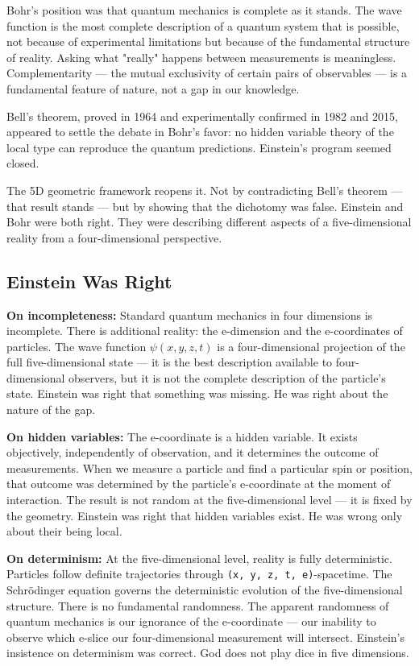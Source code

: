 \documentclass[aps,prd,preprint,superscriptaddress,longbibliography,floatfix]{revtex4-2}
\theoremstyle{remark}
\begin{document}
Bohr's position was that quantum mechanics is complete as it stands. The wave function is the most complete description of a quantum system that is possible, not because of experimental limitations but because of the fundamental structure of reality. Asking what "really" happens between measurements is meaningless. Complementarity --- the mutual exclusivity of certain pairs of observables --- is a fundamental feature of nature, not a gap in our knowledge.

Bell's theorem, proved in 1964 and experimentally confirmed in 1982 and 2015, appeared to settle the debate in Bohr's favor: no hidden variable theory of the local type can reproduce the quantum predictions. Einstein's program seemed closed.

The 5D geometric framework reopens it. Not by contradicting Bell's theorem --- that result stands --- but by showing that the dichotomy was false. Einstein and Bohr were both right. They were describing different aspects of a five-dimensional reality from a four-dimensional perspective.



\subsection{Einstein Was Right}

\textbf{On incompleteness:} Standard quantum mechanics in four dimensions is incomplete. There is additional reality: the e-dimension and the e-coordinates of particles. The wave function $\psi(x, y, z, t)$ is a four-dimensional projection of the full five-dimensional state --- it is the best description available to four-dimensional observers, but it is not the complete description of the particle's state. Einstein was right that something was missing. He was right about the nature of the gap.

\textbf{On hidden variables:} The e-coordinate is a hidden variable. It exists objectively, independently of observation, and it determines the outcome of measurements. When we measure a particle and find a particular spin or position, that outcome was determined by the particle's e-coordinate at the moment of interaction. The result is not random at the five-dimensional level --- it is fixed by the geometry. Einstein was right that hidden variables exist. He was wrong only about their being local.

\textbf{On determinism:} At the five-dimensional level, reality is fully deterministic. Particles follow definite trajectories through \texttt{(x, y, z, t, e)}-spacetime. The Schr\"{o}dinger equation governs the deterministic evolution of the five-dimensional structure. There is no fundamental randomness. The apparent randomness of quantum mechanics is our ignorance of the e-coordinate --- our inability to observe which e-slice our four-dimensional measurement will intersect. Einstein's insistence on determinism was correct. God does not play dice in five dimensions.
\end{document}
